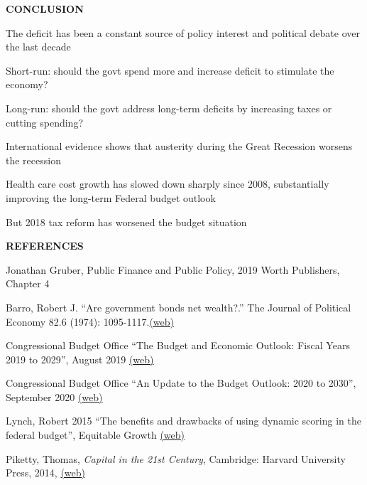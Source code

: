\documentclass[landscape]{slides}
\begin{document}
\begin{slide}
\begin{center}
{\bf CONCLUSION}
\end{center}

The deficit has been a constant source of policy interest and political debate over the last decade

Short-run: should the govt spend more and increase deficit to stimulate the economy?

Long-run: should the govt address long-term deficits by increasing taxes or cutting spending?

International evidence shows that austerity during the Great Recession worsens the recession 

Health care cost growth has slowed down sharply since 2008, substantially improving 
the long-term Federal budget outlook

But 2018 tax reform has worsened the budget situation

\end{slide}


\begin{slide}
\begin{center}
{\bf REFERENCES}
\end{center}
{\small

Jonathan Gruber, Public Finance and Public Policy, 2019 Worth Publishers, Chapter 4

Barro, Robert J. ``Are government bonds net wealth?.'' The Journal of Political Economy 82.6 (1974): 1095-1117.\href{http://elsa.berkeley.edu/~saez/course131/Barro74JPE.pdf}{(web)}

Congressional Budget Office ``The Budget and Economic Outlook: Fiscal Years 2019 to 2029'', August 2019 \href{http://elsa.berkeley.edu/~saez/course131/CBO2020report.pdf}{(web)}

Congressional Budget Office ``An Update to the Budget Outlook: 2020 to 2030'', September 2020 \href{http://elsa.berkeley.edu/~saez/course131/CBO2020report.pdf}{(web)}

Lynch, Robert 2015 ``The benefits and drawbacks of using dynamic scoring in the federal budget'', Equitable Growth \href{https://equitablegrowth.org/benefits-drawbacks-using-dynamic-scoring-federal-budget/}{(web)}

Piketty, Thomas, \emph{Capital in the 21st Century},  Cambridge: Harvard University Press, 2014,  
\href{http://piketty.pse.ens.fr/en/capital21c2}{(web)}


}

\end{slide}
\end{document}
